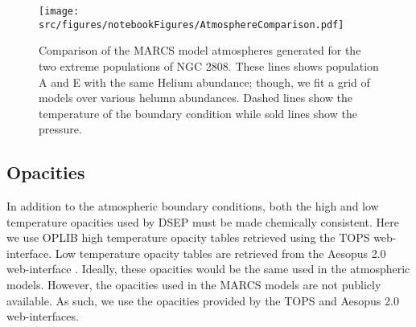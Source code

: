 \begin{figure}
	\centering
	\texttt{[image: src/figures/notebookFigures/AtmosphereComparison.pdf]}
	\label{fig:AEAtmComp}
	\caption{Comparison of the MARCS model atmospheres generated for the two
	extreme populations of NGC 2808. These lines shows population A and E with
	the same Helium abundance; though, we fit a grid of models over various
	helumn abundances. Dashed lines show the temperature of the boundary
	condition while sold lines show the pressure.}
\end{figure}


\subsection{Opacities}\label{sec:opac}
In addition to the atmospheric boundary conditions, both the high and low
temperature opacities used by DSEP must be made chemically consistent. Here we
use OPLIB high temperature opacity tables \citep{Colgan2016} retrieved using
the TOPS web-interface. Low temperature opacity tables are retrieved from the
Aesopus 2.0 web-interface \citep{Marigo2009, Marigo2022}. Ideally, these
opacities would be the same used in the atmospheric models. However, the
opacities used in the MARCS models are not publicly available. As such, we use
the opacities provided by the TOPS and Aesopus 2.0 web-interfaces.
